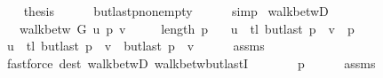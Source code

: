 \begin{isabellebody}
\ \ \isamarkupfalse%
\ {\isacharquery}{\kern0pt}thesis\isanewline
\ \ \ \ \isamarkupfalse%
\ butlast{\isacharunderscore}{\kern0pt}p{\isacharunderscore}{\kern0pt}non{\isacharunderscore}{\kern0pt}empty\isanewline
\ \ \ \ \isamarkupfalse%
\ simp\isanewline
{}\isamarkupfalse%
%
\endisatagproof
{\isafoldproof}%
%
\isadelimproof
\isanewline
%
\endisadelimproof
%
\isadeliminvisible
\isanewline
%
\endisadeliminvisible
%
\isataginvisible
{}\isamarkupfalse%
\ walk{\isacharunderscore}{\kern0pt}betwD{\isacharunderscore}{\kern0pt}{}{\isacharcolon}{\kern0pt}\isanewline
\ \ \ {\isachardoublequoteopen}walk{\isacharunderscore}{\kern0pt}betw\ G\ u\ p\ v{\isachardoublequoteclose}\isanewline
\ \ \ {\isachardoublequoteopen}{}\ {\isasymle}\ length\ p{\isachardoublequoteclose}\isanewline
\ \ \ {\isachardoublequoteopen}u\ {\isacharhash}{\kern0pt}\ tl\ {\isacharparenleft}{\kern0pt}butlast\ p{\isacharparenright}{\kern0pt}\ {\isacharat}{\kern0pt}\ {\isacharbrackleft}{\kern0pt}v{\isacharbrackright}{\kern0pt}\ {\isacharequal}{\kern0pt}\ p{\isachardoublequoteclose}%
\endisataginvisible
{\isafoldinvisible}%
%
\isadeliminvisible
\isanewline
%
\endisadeliminvisible
%
\isadelimproof
%
\endisadelimproof
%
\isatagproof
{}\isamarkupfalse%
\ {\isacharminus}{\kern0pt}\isanewline
\ \ \isamarkupfalse%
\ {\isachardoublequoteopen}u\ {\isacharhash}{\kern0pt}\ tl\ {\isacharparenleft}{\kern0pt}butlast\ p{\isacharparenright}{\kern0pt}\ {\isacharat}{\kern0pt}\ {\isacharbrackleft}{\kern0pt}v{\isacharbrackright}{\kern0pt}\ {\isacharequal}{\kern0pt}\ butlast\ p\ {\isacharat}{\kern0pt}\ {\isacharbrackleft}{\kern0pt}v{\isacharbrackright}{\kern0pt}{\isachardoublequoteclose}\isanewline
\ \ \ \ \isamarkupfalse%
\ assms\isanewline
\ \ \ \ \isamarkupfalse%
\ {\isacharparenleft}{\kern0pt}fastforce\ dest{\isacharcolon}{\kern0pt}\ walk{\isacharunderscore}{\kern0pt}betwD{\isacharparenleft}{\kern0pt}{}{\isacharparenright}{\kern0pt}\ walk{\isacharunderscore}{\kern0pt}betw{\isacharunderscore}{\kern0pt}butlastI{\isacharparenright}{\kern0pt}\isanewline
\ \ \isamarkupfalse%
\ \isamarkupfalse%
\ {\isachardoublequoteopen}{\isachardot}{\kern0pt}{\isachardot}{\kern0pt}{\isachardot}{\kern0pt}\ {\isacharequal}{\kern0pt}\ p{\isachardoublequoteclose}\isanewline
\ \ \ \ \isamarkupfalse%
\ assms{\isacharparenleft}{\kern0pt}{}{\isacharparenright}{\kern0pt}\isanewline

\end{isabellebody}
